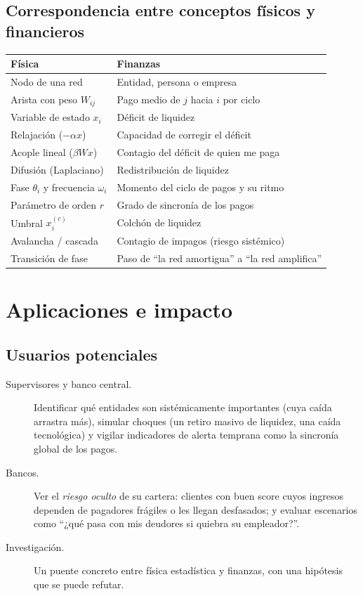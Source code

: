 \section{Correspondencia entre conceptos físicos y financieros}
\begin{center}
\begin{tabular}{p{}p{}}
\toprule
\textbf{Física} & \textbf{Finanzas} \\
\midrule
Nodo de una red & Entidad, persona o empresa \\
Arista con peso $W_{ij}$ & Pago medio de $j$ hacia $i$ por ciclo \\
Variable de estado $x_i$ & Déficit de liquidez \\
Relajación ($-\alpha x$) & Capacidad de corregir el déficit \\
Acople lineal ($\beta W x$) & Contagio del déficit de quien me paga \\
Difusión (Laplaciano) & Redistribución de liquidez \\
Fase $\theta_i$ y frecuencia $\omega_i$ & Momento del ciclo de pagos y su ritmo \\
Parámetro de orden $r$ & Grado de sincronía de los pagos \\
Umbral $x_i^{(c)}$ & Colchón de liquidez \\
Avalancha / cascada & Contagio de impagos (riesgo sistémico) \\
Transición de fase & Paso de ``la red amortigua'' a ``la red amplifica'' \\
\bottomrule
\end{tabular}
\end{center}

\chapter{Aplicaciones e impacto}

\section{Usuarios potenciales}
\begin{description}
\item[Supervisores y banco central.] Identificar qué entidades son sistémicamente
importantes (cuya caída arrastra más), simular choques (un retiro masivo de liquidez,
una caída tecnológica) y vigilar indicadores de alerta temprana como la sincronía
global de los pagos.
\item[Bancos.] Ver el \emph{riesgo oculto} de su cartera: clientes con buen score
cuyos ingresos dependen de pagadores frágiles o les llegan desfasados; y evaluar
escenarios como ``¿qué pasa con mis deudores si quiebra su empleador?''.
\item[Investigación.] Un puente concreto entre física estadística y finanzas, con
una hipótesis que se puede refutar.
\end{description}

